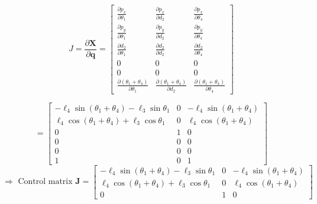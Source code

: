 \[
J = \frac{\partial \mathbf{X}}{\partial \mathbf{q}} =
\begin{bmatrix}
\frac{\partial p_x}{\partial \theta_1} & \frac{\partial p_x}{\partial d_2} & \frac{\partial p_x}{\partial \theta_4} \\
\frac{\partial p_y}{\partial \theta_1} & \frac{\partial p_y}{\partial d_2} & \frac{\partial p_y}{\partial \theta_4} \\
\frac{\partial d_2}{\partial \theta_1} & \frac{\partial d_2}{\partial d_2} & \frac{\partial d_2}{\partial \theta_4} \\
0 & 0 & 0 \\
0 & 0 & 0 \\
\frac{\partial (\theta_1 + \theta_4)}{\partial \theta_1} & \frac{\partial (\theta_1 + \theta_4)}{\partial d_2} & \frac{\partial (\theta_1 + \theta_4)}{\partial \theta_4}
\end{bmatrix}
\]

\[
=
\begin{bmatrix}
-\ell_4 \sin(\theta_1 + \theta_4) - \ell_3 \sin\theta_1 & 0 & -\ell_4 \sin(\theta_1 + \theta_4) \\
\ell_4 \cos(\theta_1 + \theta_4) + \ell_3 \cos\theta_1 & 0 & \ell_4 \cos(\theta_1 + \theta_4) \\
0 & 1 & 0 \\
0 & 0 & 0 \\
0 & 0 & 0 \\
1 & 0 & 1
\end{bmatrix}
\]
\[
\Rightarrow \text{ Control matrix } \mathbf{J} = 
\begin{bmatrix}
-\ell_4 \sin(\theta_1 + \theta_4) - \ell_3 \sin \theta_1 & 0 & -\ell_4 \sin(\theta_1 + \theta_4) \\
\ell_4 \cos(\theta_1 + \theta_4) + \ell_3 \cos \theta_1 & 0 & \ell_4 \cos(\theta_1 + \theta_4) \\
0 & 1 & 0
\end{bmatrix}
\]